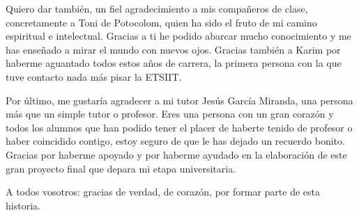 Quiero dar también, un fiel agradecimiento a mis compañeros de clase, concretamente a Toni de Potocolom, quien ha sido el fruto de mi camino espiritual e intelectual. Gracias a ti he podido abarcar mucho conocimiento y me has enseñado a mirar el mundo con nuevos ojos. Gracias también a Karim por haberme aguantado todos estos años de carrera, la primera persona con la que tuve contacto nada más pisar la ETSIIT.

Por último, me gustaría agradecer a mi tutor Jesús García Miranda, una persona más que un simple tutor o profesor. Eres una persona con un gran corazón y todos los alumnos que han podido tener el placer de haberte tenido de profesor o haber coincidido contigo, estoy seguro de que le has dejado un recuerdo bonito. Gracias por haberme apoyado y por haberme ayudado en la elaboración de este gran proyecto final que depara mi etapa universitaria.

A todos vosotros: gracias de verdad, de corazón, por formar parte de esta historia.